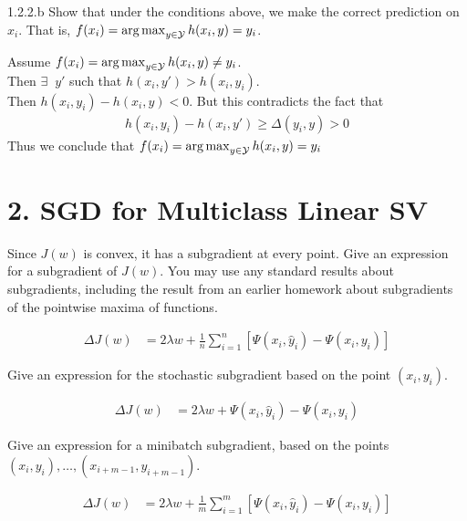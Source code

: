 \documentclass[12pt,letterpaper]{article}
\begin{document}
\begin{problem}{1.2.2.b}
    Show that under the conditions above, we make the correct prediction
    on $x_{i}$. That is, $f(x_{i})=\argmax_{y\in\cy}h(x_{i},y)=y_{i}$.
\end{problem}
\begin{solution}{}
    Assume $f(x_{i})=\argmax_{y\in\cy}h(x_{i},y)\neq y_{i}$.\\
    Then $\exists \;\; y'$ such that $h(x_{i},y') > h(x_{i},y_i)$.\\
    Then $h(x_{i},y_i) - h(x_{i},y) < 0$. But this contradicts the fact that 
    \begin{align*}
        h(x_{i},y_i) - h(x_{i},y') \geq \Delta(y_i,y) > 0
    \end{align*}
    Thus we conclude that $f(x_{i})=\argmax_{y\in\cy}h(x_{i},y)= y_{i}$
\end{solution}
\newpage

\section*{2. SGD for Multiclass Linear SV}
\begin{problem}{2.2}
    Since $J(w)$ is convex, it has a subgradient at every point. Give
    an expression for a subgradient of $J(w)$. You may use any standard
    results about subgradients, including the result from an earlier homework
    about subgradients of the pointwise maxima of functions.
\end{problem}
\begin{solution}{}
    \begin{align*}
        \Delta J(w) &= 2\lambda w + \frac{1}{n} \sum_{i=1}^n\left[\Psi(x_i,\hat{y}_i) - \Psi(x_i,y_i)\right]
    \end{align*}
\end{solution}
\newpage

\begin{problem}{2.3}
    Give an expression for the stochastic subgradient based on the point $(x_{i},y_{i})$.
\end{problem}
\begin{solution}{}
    \begin{align*}
        \Delta J(w) &= 2\lambda w + \Psi(x_i,\hat{y}_i) - \Psi(x_i,y_i)
    \end{align*}
\end{solution}
\newpage

\begin{problem}{2.4}
    \item Give an expression for a minibatch subgradient, based on the points $(x_{i},y_{i}),\ldots,\left(x_{i+m-1},y_{i+m-1}\right)$.
\end{problem}
\begin{solution}{}
    \begin{align*}
        \Delta J(w) &= 2\lambda w + \frac{1}{m} \sum_{i=1}^m\left[\Psi(x_i,\hat{y}_i) - \Psi(x_i,y_i)\right]
    \end{align*}
\end{solution}
\newpage
\end{document}
